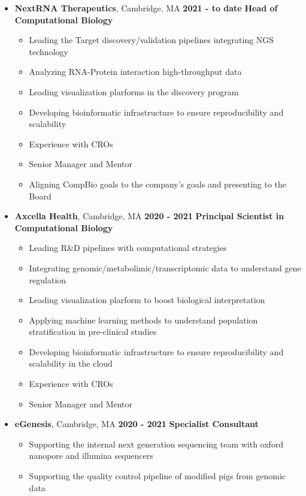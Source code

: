 \begin{itemize}

\item
\textbf{NextRNA Therapeutics}, Cambridge, MA \hfill \textbf{2021 - to date}
\newline
\textbf{Head of Computational Biology}
\begin{itemize}
\item
  Leading the Target discovery/validation pipelines integrating NGS technology
\item
  Analyzing RNA-Protein interaction high-throughput data
\item
  Leading visualization plarforms in the discovery program
\item  
  Developing bioinformatic infrastructure to ensure reproducibility and scalability
\item
  Experience with CROs
\item
 Senior Manager and Mentor
\item
 Aligning CompBio goals to the company's goals and presenting to the Board
\end{itemize}

\item
\textbf{Axcella Health}, Cambridge, MA \hfill \textbf{2020 - 2021}
\newline
\textbf{Principal Scientist in Computational Biology}
\begin{itemize}
\item
  Leading R\&D pipelines with computational strategies
\item
  Integrating genomic/metabolimic/transcriptomic data to understand gene regulation
\item 
  Leading visualization plarform to boost biological interpretation
\item
  Applying machine learning methods to understand population stratification in pre-clinical studies
\item 
  Developing bioinformatic infrastructure to ensure reproducibility and scalability in the cloud
\item
  Experience with CROs
\item
  Senior Manager and Mentor
\end{itemize}

\item
\textbf{eGenesis}, Cambridge, MA \hfill \textbf{2020 - 2021}
\newline
\textbf{Specialist Consultant}
\begin{itemize}
\item Supporting the internal next generation sequencing team with oxford nanopore and illumina sequencers
\item Supporting the quality control pipeline of modified pigs from genomic data
\end{itemize}



\end{itemize}
